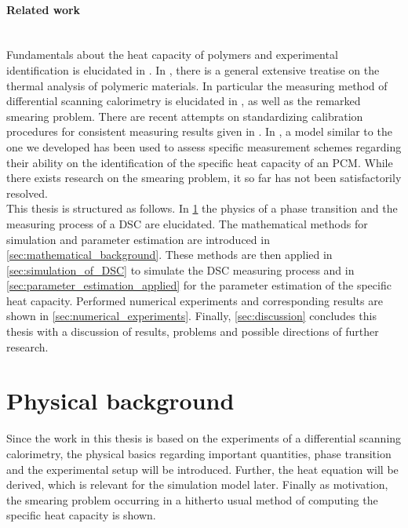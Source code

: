 \documentclass{scrartcl}[12pt, halfparskip]
\numberwithin{equation}{section}
\numberwithin{figure}{section}
\numberwithin{table}{section}
\begin{document}
\paragraph{Related work} \mbox{}\\
Fundamentals about the heat capacity of polymers and experimental identification is elucidated in \cite{wunderlich_heat_capacity_polymers}.
In \cite{wunderlich_thermal_analysis}, there is a general extensive treatise on the thermal analysis of polymeric materials.
In particular the measuring method of differential scanning calorimetry is elucidated in \cite{Hoehne_DSC}, as well as the remarked smearing problem. 
There are recent attempts on standardizing calibration procedures for consistent measuring results given in \cite{standardization_of_PCM}. 
In \cite{diss_DSC}, a model similar to the one we developed has been used to assess specific measurement schemes regarding their ability on the identification of the specific heat capacity of an PCM. 
While there exists research on the smearing problem, it so far has not been satisfactorily resolved. \\

This thesis is structured as follows. In \cref{sec:physical_background} the physics of a phase transition and the measuring process of a DSC are elucidated. 
The mathematical methods for simulation and parameter estimation are introduced in \cref{sec:mathematical_background}. These methods are then applied in \cref{sec:simulation_of_DSC} to simulate the DSC measuring process and in \cref{sec:parameter_estimation_applied} for the parameter estimation of the specific heat capacity. Performed numerical experiments and corresponding results are shown in \cref{sec:numerical_experiments}. Finally, \cref{sec:discussion} concludes this thesis with a discussion of results, problems and possible directions of further research.


\section{Physical background}
\label{sec:physical_background}

Since the work in this thesis is based on the experiments of a differential scanning calorimetry, the physical basics regarding important quantities, phase transition and the experimental setup will be introduced. Further, the heat equation will be derived, which is relevant for the simulation model later. Finally as motivation, the smearing problem occurring in a hitherto usual method of computing the specific heat capacity is shown.
\end{document}
